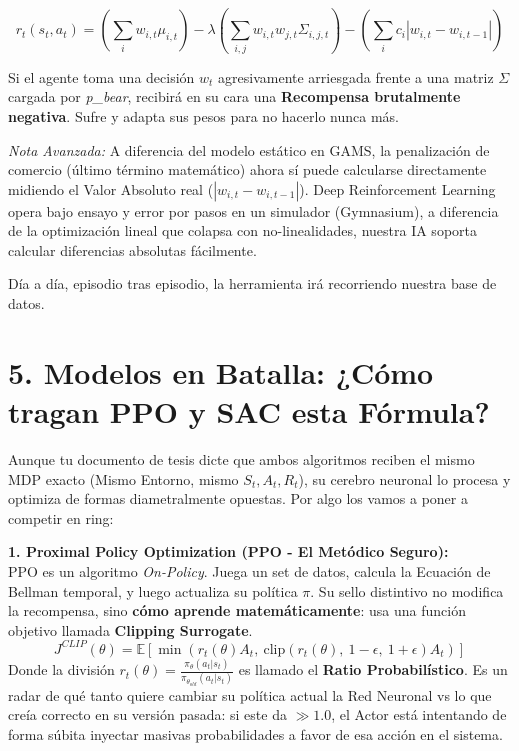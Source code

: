 \documentclass[11pt]{article}
\begin{document}
\begin{equation}
r_t(s_t, a_t) = \left( \sum_{i} w_{i,t} \mu_{i,t} \right) - \lambda \left( \sum_{i,j} w_{i,t} w_{j,t} \Sigma_{i,j,t} \right) - \left( \sum_{i} c_i |w_{i,t} - w_{i,t-1}| \right)
\end{equation}

Si el agente toma una decisión $w_t$ agresivamente arriesgada frente a una matriz $\Sigma$ cargada por \textit{p\_bear}, recibirá en su cara una \textbf{Recompensa brutalmente negativa}. Sufre y adapta sus pesos para no hacerlo nunca más. 

\textit{Nota Avanzada:} A diferencia del modelo estático en GAMS, la penalización de comercio (último término matemático) ahora sí puede calcularse directamente midiendo el Valor Absoluto real ($|w_{i,t} - w_{i,t-1}|$). Deep Reinforcement Learning opera bajo ensayo y error por pasos en un simulador (Gymnasium), a diferencia de la optimización lineal que colapsa con no-linealidades, nuestra IA soporta calcular diferencias absolutas fácilmente.

Día a día, episodio tras episodio, la herramienta irá recorriendo nuestra base de datos.
    
\section{5. Modelos en Batalla: ¿Cómo tragan PPO y SAC esta Fórmula?}
Aunque tu documento de tesis dicte que ambos algoritmos reciben el mismo MDP exacto (Mismo Entorno, mismo $S_t, A_t, R_t$), su cerebro neuronal lo procesa y optimiza de formas diametralmente opuestas. Por algo los vamos a poner a competir en ring:

\textbf{1. Proximal Policy Optimization (PPO - El Metódico Seguro):}\\
PPO es un algoritmo \textit{On-Policy}. Juega un set de datos, calcula la Ecuación de Bellman temporal, y luego actualiza su política $\pi$. Su sello distintivo no modifica la recompensa, sino \textbf{cómo aprende matemáticamente}: usa una función objetivo llamada \textbf{Clipping Surrogate}.
\begin{equation}
    J^{CLIP}(\theta) = \mathbb{E} \left[ \min \left( r_t(\theta) A_t, \ \text{clip}(r_t(\theta), \ 1-\epsilon, \ 1+\epsilon) A_t \right) \right]
\end{equation}
Donde la división $r_t(\theta) = \frac{\pi_\theta(a_t|s_t)}{\pi_{\theta_{old}}(a_t|s_t)}$ es llamado el \textbf{Ratio Probabilístico}. Es un radar de qué tanto quiere cambiar su política actual la Red Neuronal vs lo que creía correcto en su versión pasada: si este da $\gg 1.0$, el Actor está intentando de forma súbita inyectar masivas probabilidades a favor de esa acción en el sistema.
\end{document}
